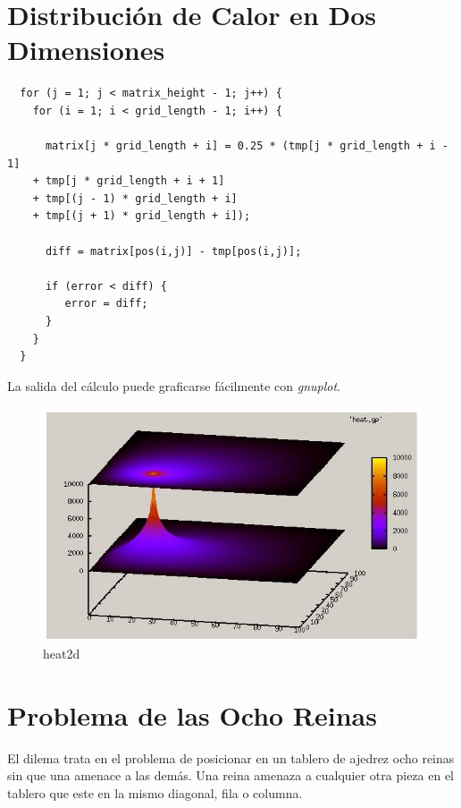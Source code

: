 \documentclass[a4paper]{report}
\begin{document}
\section{Distribuci\'on de Calor en Dos Dimensiones}

\begin{verbatim}
  for (j = 1; j < matrix_height - 1; j++) {
    for (i = 1; i < grid_length - 1; i++) {
      
      matrix[j * grid_length + i] = 0.25 * (tmp[j * grid_length + i - 1]
    + tmp[j * grid_length + i + 1]
    + tmp[(j - 1) * grid_length + i]
    + tmp[(j + 1) * grid_length + i]);

      diff = matrix[pos(i,j)] - tmp[pos(i,j)];

      if (error < diff) {
         error = diff;
      }
    }
  }
\end{verbatim}

La salida del c\'alculo puede graficarse f\'acilmente con {\it gnuplot}.

\begin{figure}[H]
\begin{center}
\includegraphics[width=12cm]{heat2d.png}
\caption{heat2d}
\end{center}
\end{figure}

\section{Problema de las Ocho Reinas}

El dilema trata en el problema de posicionar en un tablero de ajedrez ocho
reinas sin que una amenace a las dem\'as. Una reina amenaza a cualquier otra
pieza en el tablero que este en la mismo diagonal, fila o columna.

\bigskip
\end{document}
